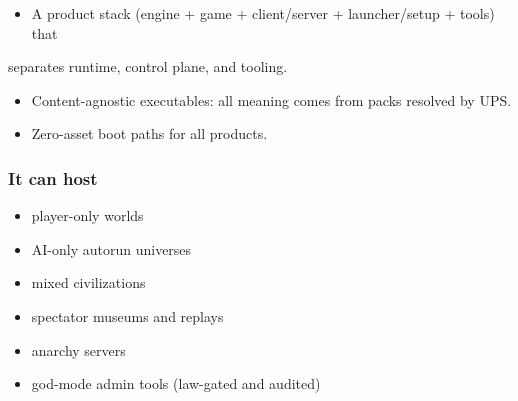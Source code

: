 \documentclass[9pt,a4paper,openany]{book}
\begin{document}
\begin{itemize}
\item A product stack (engine + game + client/\allowbreak{}server + launcher/\allowbreak{}setup + tools) that
\end{itemize}


separates runtime, control plane, and tooling.\allowbreak{}



\begin{itemize}
\item Content-\allowbreak{}agnostic executables: all meaning comes from packs resolved by UPS.\allowbreak{}
\end{itemize}


\begin{itemize}
\item Zero-\allowbreak{}asset boot paths for all products.\allowbreak{}
\end{itemize}





\subsubsection{It can host}


\begin{itemize}
\item player-\allowbreak{}only worlds
\end{itemize}


\begin{itemize}
\item AI-\allowbreak{}only autorun universes
\end{itemize}


\begin{itemize}
\item mixed civilizations
\end{itemize}


\begin{itemize}
\item spectator museums and replays
\end{itemize}


\begin{itemize}
\item anarchy servers
\end{itemize}


\begin{itemize}
\item god-\allowbreak{}mode admin tools (law-\allowbreak{}gated and audited)
\end{itemize}
\end{document}
